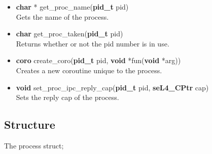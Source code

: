 \documentclass[12pt]{article}
\begin{document}
\begin{itemize}
\item \textbf{char} * get\_proc\_name(\textbf{pid\_t} pid)\\
Gets the name of the process.
\item \textbf{char} get\_proc\_taken(\textbf{pid\_t} pid)\\
Returns whether or not the pid number is in use.
\item \textbf{coro} create\_coro(\textbf{pid\_t} pid, \textbf{void} *fun(\textbf{void} *arg))\\
Creates a new coroutine unique to the process.
\item \textbf{void} set\_proc\_ipc\_reply\_cap(\textbf{pid\_t} pid, \textbf{seL4\_CPtr} cap)\\
Sets the reply cap of the process.
\end{itemize}
\subsection{Structure}
The process struct;
\end{document}
